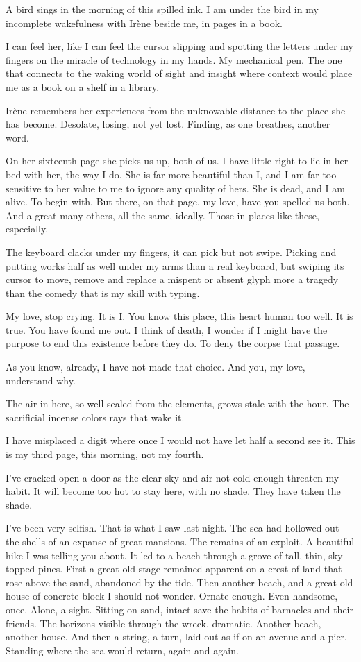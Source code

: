 A bird sings in the morning of this spilled ink.  I am under the bird
in my incomplete wakefulness with Ir\`{e}ne beside me, in pages in a
book.

I can feel her, like I can feel the cursor slipping and spotting the
letters under my fingers on the miracle of technology in my hands.  My
mechanical pen.  The one that connects to the waking world of sight
and insight where context would place me as a book on a shelf in a
library.

Ir\`{e}ne remembers her experiences from the unknowable distance to
the place she has become.  Desolate, losing, not yet lost.  Finding,
as one breathes, another word.

\vfill
\break

﻿On her sixteenth page she picks us up, both of us.  I have little
right to lie in her bed with her, the way I do.  She is far more
beautiful than I, and I am far too sensitive to her value to me to
ignore any quality of hers.  She is dead, and I am alive.  To begin
with.  But there, on that page, my love, have you spelled us both.
And a great many others, all the same, ideally.  Those in places like
these, especially.

The keyboard clacks under my fingers, it can pick but not swipe.
Picking and putting works half as well under my arms than a real
keyboard, but swiping its cursor to move, remove and replace a mispent
or absent glyph more a tragedy than the comedy that is my skill with
typing.

My love, stop crying.  It is I.  You know this place, this heart human
too well.  It is true.  You have found me out.  I think of death, I
wonder if I might have the purpose to end this existence before they
do.  To deny the corpse that passage.

As you know, already, I have not made that choice.  And you, my love,
understand why.

The air in here, so well sealed from the elements, grows stale with
the hour.  The sacrificial incense colors rays that wake it.

I have misplaced a digit where once I would not have let half a second
see it.  This is my third page, this morning, not my fourth.

I've cracked open a door as the clear sky and air not cold enough
threaten my habit.  It will become too hot to stay here, with no
shade.  They have taken the shade.

I've been very selfish.  That is what I saw last night.  The sea had
hollowed out the shells of an expanse of great mansions.  The remains
of an exploit.  A beautiful hike I was telling you about.  It led to a
beach through a grove of tall, thin, sky topped pines.  First a great
old stage remained apparent on a crest of land that rose above the
sand, abandoned by the tide.  Then another beach, and a great old
house of concrete block I should not wonder.  Ornate enough.  Even
handsome, once.  Alone, a sight.  Sitting on sand, intact save the
habits of barnacles and their friends.  The horizons visible through
the wreck, dramatic.  Another beach, another house.  And then a string,
a turn, laid out as if on an avenue and a pier.  Standing where the
sea would return, again and again.

